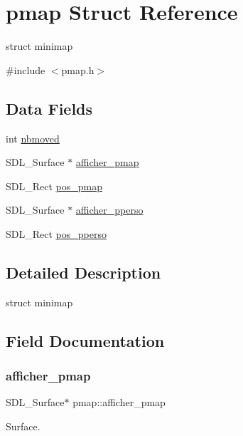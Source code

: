 \hypertarget{structpmap}{}\section{pmap Struct Reference}
\label{structpmap}


struct minimap  




{\ttfamily \#include $<$pmap.\+h$>$}

\subsection*{Data Fields}
\begin{DoxyCompactItemize}
\item 
int \hyperlink{structpmap_a70b813baa5dd1ba32e676491019f344c}{nbmoved}
\item 
S\+D\+L\+\_\+\+Surface $\ast$ \hyperlink{structpmap_a4fd1750570590001528322da168bbf8e}{afficher\+\_\+pmap}
\item 
S\+D\+L\+\_\+\+Rect \hyperlink{structpmap_a1ec871d94c7648f3f1dc49e9cd3146d5}{pos\+\_\+pmap}
\item 
S\+D\+L\+\_\+\+Surface $\ast$ \hyperlink{structpmap_a8c940484d97587e6c202433f7c2d5673}{afficher\+\_\+pperso}
\item 
S\+D\+L\+\_\+\+Rect \hyperlink{structpmap_a6534b3c60d544631809c86d76450b592}{pos\+\_\+pperso}
\end{DoxyCompactItemize}


\subsection{Detailed Description}
struct minimap 

\subsection{Field Documentation}
\mbox{\label{structpmap_a4fd1750570590001528322da168bbf8e}} 
\subsubsection{\texorpdfstring{afficher\+\_\+pmap}{afficher\_pmap}}
{\footnotesize\ttfamily S\+D\+L\+\_\+\+Surface$\ast$ pmap\+::afficher\+\_\+pmap}

Surface. \mbox{\label{structpmap_a8c940484d97587e6c202433f7c2d5673}} 
